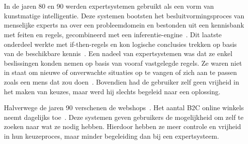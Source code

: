 
\chapter{}%
\label{ch:inleiding}



In de jaren 80 en 90 werden expertsystemen gebruikt als een vorm van kunstmatige intelligentie. Deze systemen bootsten het besluitvormingsproces van menselijke experts na over een probleemdomein en bestonden uit een kennisbank met feiten en regels, gecombineerd met een inferentie-engine~\autocite{Angeli2010,Castillo2012}. Dit laatste onderdeel werkte met if-then-regels en kon logische conclusies trekken op basis van de beschikbare kennis~\autocite{Buchanan1988}. Een nadeel van expertsystemen was dat ze enkel beslissingen konden nemen op basis van vooraf vastgelegde regels. Ze waren niet in staat om nieuwe of onverwachte situaties op te vangen of zich aan te passen zoals een mens dat zou doen~\autocite{Castillo2012}. Bovendien had de gebruiker zelf geen vrijheid in het maken van keuzes, maar werd hij slechts begeleid naar een oplossing.

Halverwege de jaren 90 verschenen de webshops~\autocite{Chu2007}. Het aantal B2C online winkels neemt dagelijks toe~\autocite{Pokki2016}. Deze systemen geven gebruikers de mogelijkheid om zelf te zoeken naar wat ze nodig hebben. Hierdoor hebben ze meer controle en vrijheid in hun keuzeproces, maar minder begeleiding dan bij een expertsysteem. 

